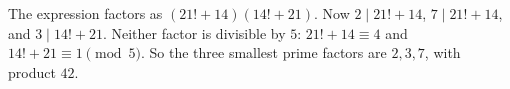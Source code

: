 The expression factors as $(21!+14)(14!+21)$. Now $2\mid21!+14$, $7\mid21!+14$, and $3\mid14!+21$. Neither factor is divisible by $5$: $21!+14\equiv4$ and $14!+21\equiv1\pmod5$. So the three smallest prime factors are $2,3,7$, with product $\boxed{42}$.
